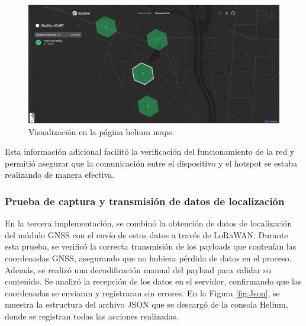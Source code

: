 \begin{figure}[H]
\leavevmode
\begin{minipage}{\textwidth}
\begin{center}
\includegraphics[width=\textwidth]{./capitulo_04/imagen/maps.png}
\end{center}
\caption{Visualización en la página helium maps.\label{fig:maps}}
\end{minipage}
\end{figure}

Esta información adicional facilitó la verificación del funcionamiento de la red y permitió asegurar que la comunicación entre el dispositivo y el hotspot se estaba realizando de manera efectiva.

\subsubsection{Prueba de captura y transmisión de datos de localización} 
En la tercera implementación, se combinó la obtención de datos de localización del módulo GNSS con el envío de estos datos a través de LoRaWAN. Durante esta prueba, se verificó la correcta transmisión de los payloads que contenían las coordenadas GNSS, asegurando que no hubiera pérdida de datos en el proceso. Además, se realizó una decodificación manual del payload para validar su contenido. Se analizó la recepción de los datos en el servidor, confirmando que las coordenadas se enviaran y registraran sin errores. En la Figura \ref{fig:Json}, se muestra la estructura del archivo JSON que se descargó de la consola Helium, donde se registran todas las acciones realizadas.

